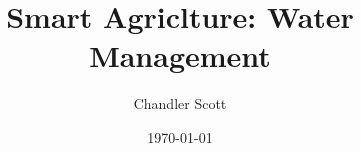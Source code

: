 \documentclass{beamer}
\title{Smart Agriclture: Water Management}
\author{Chandler Scott}
\date{\today}
\begin{document}
\frame{\titlepage}





\end{document}
